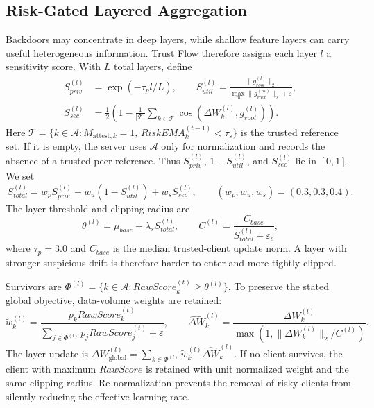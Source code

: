 \documentclass[final,5p,times,twocolumn]{elsarticle/elsarticle}
\begin{document}
\subsection{Risk-Gated Layered Aggregation}
Backdoors may concentrate in deep layers, while shallow feature layers can
carry useful heterogeneous information. Trust Flow therefore assigns each
layer $l$ a sensitivity score. With $L$ total layers, define
\begin{align}
    S_{priv}^{(l)}&=\exp(-\tau_p l/L),\qquad
    S_{util}^{(l)}=\frac{\|g_{root}^{(l)}\|_2}
    {\max_m\|g_{root}^{(m)}\|_2+\varepsilon},\\
    S_{sec}^{(l)}&=\frac{1}{2}\left(1-\frac{1}{|\mathcal{T}|}
    \sum_{k\in\mathcal{T}}\cos(\Delta W_k^{(l)},g_{root}^{(l)})\right).
\end{align}
Here
$\mathcal{T}=\{k\in\mathcal{A}:M_{\mathrm{attest},k}=1,\,
RiskEMA_k^{(t-1)}<\tau_s\}$ is the trusted reference set. If it is empty, the
server uses $\mathcal{A}$ only for normalization and records the absence of a
trusted peer reference. Thus $S_{priv}^{(l)}$, $1-S_{util}^{(l)}$, and
$S_{sec}^{(l)}$ lie in $[0,1]$. We set
\begin{equation}
    S_{total}^{(l)}=w_pS_{priv}^{(l)}+w_u(1-S_{util}^{(l)})
    +w_sS_{sec}^{(l)},\qquad (w_p,w_u,w_s)=(0.3,0.3,0.4).
\end{equation}
The layer threshold and clipping radius are
\begin{equation}
    \theta^{(l)}=\mu_{base}+\lambda_sS_{total}^{(l)},\qquad
    C^{(l)}=\frac{C_{base}}{S_{total}^{(l)}+\varepsilon_c},
\end{equation}
where $\tau_p=3.0$ and $C_{base}$ is the median trusted-client update norm.
A layer with stronger suspicious drift is therefore harder to enter and more
tightly clipped.

Survivors are
$\Phi^{(l)}=\{k\in\mathcal{A}:RawScore_k^{(t)}\geq\theta^{(l)}\}$. To preserve
the stated global objective, data-volume weights are retained:
\begin{equation}
    \tilde{w}_k^{(l)}=
    \frac{p_kRawScore_k^{(t)}}{\sum_{j\in\Phi^{(l)}}p_jRawScore_j^{(t)}
    +\varepsilon},\qquad
    \widehat{\Delta W}_k^{(l)}=
    \frac{\Delta W_k^{(l)}}{\max(1,\|\Delta W_k^{(l)}\|_2/C^{(l)})}.
\end{equation}
The layer update is
$\Delta W_{\mathrm{global}}^{(l)}
=\sum_{k\in\Phi^{(l)}}\tilde{w}_k^{(l)}
\widehat{\Delta W}_k^{(l)}$. If no client survives, the client with maximum
$RawScore$ is retained with unit normalized weight and the same clipping radius.
Re-normalization prevents the removal of risky clients from silently reducing
the effective learning rate.
\end{document}
